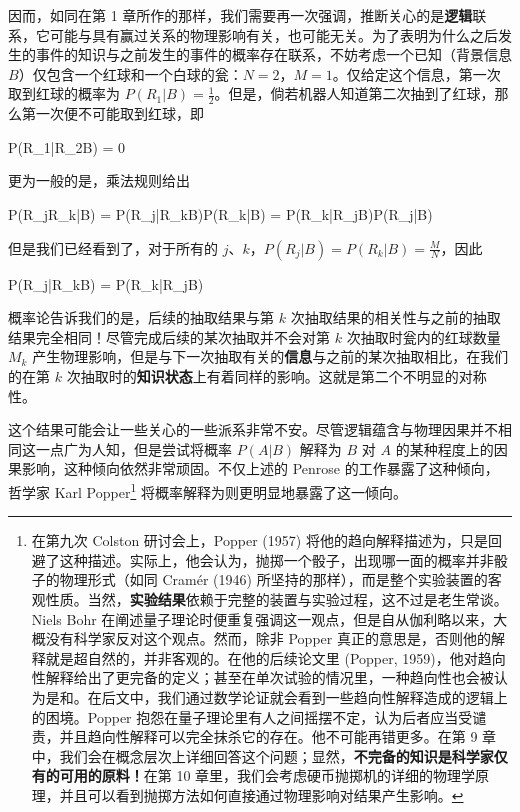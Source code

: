 因而，如同在第 1 章所作的那样，我们需要再一次强调，推断关心的是{\bf 逻辑}联系，它可能与具有赢过关系的物理影响有关，也可能无关。为了表明为什么之后发生的事件的知识与之前发生的事件的概率存在联系，不妨考虑一个已知（背景信息 $B$）仅包含一个红球和一个白球的瓮：$N = 2$，$M = 1$。仅给定这个信息，第一次取到红球的概率为 $P(R_1|B) = \frac{1}{2}$。但是，倘若机器人知道第二次抽到了红球，那么第一次便不可能取到红球，即

\placeformula[3-38]
\startformula
P(R_1|R_2B) = 0
\stopformula

更为一般的是，乘法规则给出

\placeformula[3-39]
\startformula
P(R_jR_k|B) = P(R_j|R_kB)P(R_k|B) = P(R_k|R_jB)P(R_j|B)
\stopformula

但是我们已经看到了，对于所有的 $j$、$k$，$P(R_j|B) = P(R_k|B) = \frac{M}{N}$，因此

\placeformula[3-40]
\startformula
P(R_j|R_kB) = P(R_k|R_jB)
\stopformula

概率论告诉我们的是，后续的抽取结果与第 $k$ 次抽取结果的相关性与之前的抽取结果完全相同！尽管完成后续的某次抽取并不会对第 $k$ 次抽取时瓮内的红球数量 $M_k$ 产生物理影响，但是与下一次抽取有关的{\bf 信息}与之前的某次抽取相比，在我们的在第 $k$ 次抽取时的{\bf 知识状态}上有着同样的影响。这就是第二个不明显的对称性。

这个结果可能会让一些关心的一些派系非常不安。尽管逻辑蕴含与物理因果并不相同这一点广为人知，但是尝试将概率 $P(A|B)$ 解释为 $B$ 对 $A$ 的某种程度上的因果影响，这种倾向依然非常顽固。不仅上述的 Penrose 的工作暴露了这种倾向，哲学家 Karl Popper\footnote{在第九次 Colston 研讨会上，Popper (1957) 将他的趋向解释描述为，只是回避了这种描述。实际上，他会认为，抛掷一个骰子，出现哪一面的概率并非骰子的物理形式（如同 Cram\'er (1946) 所坚持的那样），而是整个实验装置的客观性质。当然，{\bf 实验结果}依赖于完整的装置与实验过程，这不过是老生常谈。Niels Bohr 在阐述量子理论时便重复强调这一观点，但是自从伽利略以来，大概没有科学家反对这个观点。然而，除非 Popper 真正的意思是，否则他的解释就是超自然的，并非客观的。在他的后续论文里 (Popper, 1959)，他对趋向性解释给出了更完备的定义；甚至在单次试验的情况里，一种趋向性也会被认为是和。在后文中，我们通过数学论证就会看到一些趋向性解释造成的逻辑上的困境。Popper 抱怨在量子理论里有人之间摇摆不定，认为后者应当受谴责，并且趋向性解释可以完全抹杀它的存在。他不可能再错更多。在第 9 章中，我们会在概念层次上详细回答这个问题；显然，{\bf 不完备的知识是科学家仅有的可用的原料！}在第 10 章里，我们会考虑硬币抛掷机的详细的物理学原理，并且可以看到抛掷方法如何直接通过物理影响对结果产生影响。} 将概率解释为则更明显地暴露了这一倾向。

